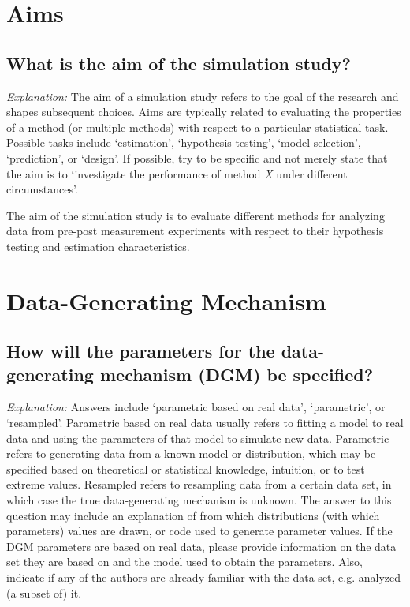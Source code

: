 \documentclass[12pt]{article}
\begin{document}
\section{Aims}
\subsection{What is the aim of the simulation study?}
 
\textit{Explanation:} The aim of a simulation study refers to the goal of the research and shapes subsequent choices. Aims are typically related to evaluating the properties of a method (or multiple methods) with respect to a particular statistical task. Possible tasks include `estimation', `hypothesis testing', `model selection', `prediction', or `design'. If possible, try to be specific and not merely state that the aim is to `investigate the performance of method \textit{X} under different circumstances'. 
    
\begin{examplebox}
The aim of the simulation study is to evaluate different methods for analyzing data from pre-post measurement experiments with respect to their hypothesis testing and estimation characteristics.
\end{examplebox}


\section{Data-Generating Mechanism}
\subsection{How will the parameters for the data-generating mechanism (DGM) be specified?}    
\textit{Explanation:} Answers include `parametric based on real data', `parametric', or `resampled'. Parametric based on real data usually refers to fitting a model to real data and using the parameters of that model to simulate new data. Parametric refers to generating data from a known model or distribution, which may be specified based on theoretical or statistical knowledge, intuition, or to test extreme values. Resampled refers to resampling data from a certain data set, in which case the true data-generating mechanism is unknown. The answer to this question may include an explanation of from which distributions (with which parameters) values are drawn, or code used to generate parameter values. If the DGM parameters are based on real data, please provide information on the data set they are based on and the model used to obtain the parameters. Also, indicate if any of the authors are already familiar with the data set, e.g. analyzed (a subset of) it. 
    
\end{document}
